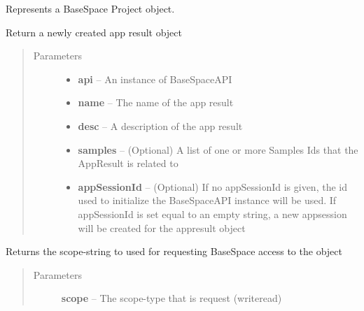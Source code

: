 \documentclass[letterpaper,10pt,english]{sphinxmanual}
\begin{document}
\begin{fulllineitems}
\label{Available modules:BaseSpacePy.model.Project.Project}
Represents a BaseSpace Project object.

\begin{fulllineitems}
\label{Available modules:BaseSpacePy.model.Project.Project.createAppResult}
Return a newly created app result object
\begin{quote}\begin{description}
\item[{Parameters}] \leavevmode\begin{itemize}
\item {} 
\textbf{api} -- An instance of BaseSpaceAPI

\item {} 
\textbf{name} -- The name of the app result

\item {} 
\textbf{desc} -- A description of the app result

\item {} 
\textbf{samples} -- (Optional) A list of one or more Samples Ids that the AppResult is related to

\item {} 
\textbf{appSessionId} -- (Optional) If no appSessionId is given, the id used to initialize the BaseSpaceAPI instance will be used. If appSessionId is set equal to an empty string, a new appsession will be created for the appresult object

\end{itemize}

\end{description}\end{quote}

\end{fulllineitems}


\begin{fulllineitems}
\label{Available modules:BaseSpacePy.model.Project.Project.getAccessStr}
Returns the scope-string to used for requesting BaseSpace access to the object
\begin{quote}\begin{description}
\item[{Parameters}] \leavevmode
\textbf{scope} -- The scope-type that is request (write\textbar{}read)


\end{description}
\end{quote}
\end{fulllineitems}
\end{fulllineitems}
\end{document}

